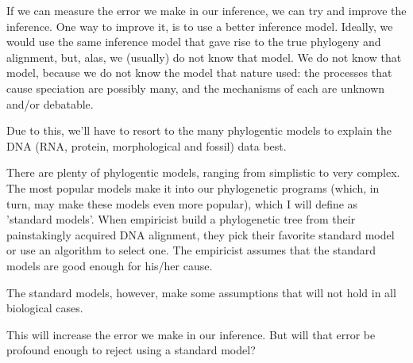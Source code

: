 If we can measure the error we make in our inference, 
we can try and improve the inference. 
One way to improve it, is to use a better inference model.
Ideally, we would use the same inference model that gave rise to
the true phylogeny and alignment, but, alas, 
we (usually) do not know that model.
We do not know that model, because we do not know the
model that nature used: the
processes that cause speciation are possibly many, and 
the mechanisms of each are unknown and/or debatable.


Due to this, we'll have to resort to the many phylogentic models 
to explain the DNA (RNA, protein, morphological and fossil) data best.

There are plenty of phylogentic models, ranging from simplistic to
very complex. The most popular models make it into our
phylogenetic programs (which, in turn, may make these models even
more popular), which I will define as 'standard models'.
When empiricist build a phylogenetic tree from their
painstakingly acquired DNA alignment, they pick their favorite standard
model or use an algorithm to select one. The empiricist assumes that the
standard models are good enough for his/her cause.

The standard models, however, make some assumptions that will not hold
in all biological cases.


This will increase the error we make in
our inference. But will that error be profound enough to reject using
a standard model? 

